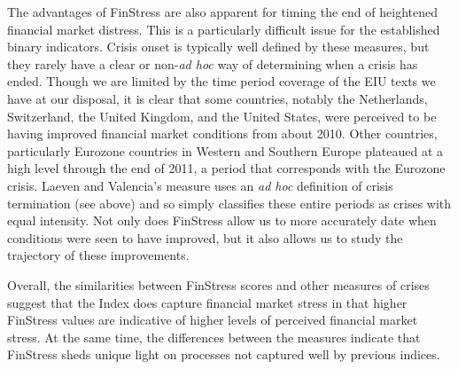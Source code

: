 \documentclass[]{article}
\begin{document}
The advantages of FinStress are also apparent for timing the end of heightened financial market distress. This is a particularly difficult issue for the established binary indicators. Crisis onset is typically well defined by these measures, but they rarely have a clear or non-\emph{ad hoc} way of determining when a crisis has ended. Though we are limited by the time period coverage of the EIU texts we have at our disposal, it is clear that some countries, notably the Netherlands, Switzerland, the United Kingdom, and the United States, were perceived to be having improved financial market conditions from about 2010. Other countries, particularly Eurozone countries in Western and Southern Europe plateaued at a high level through the end of 2011, a period that corresponds with the Eurozone crisis. Laeven and Valencia's measure uses an \emph{ad hoc} definition of crisis termination (see above) and so simply classifies these entire periods as crises with equal intensity. Not only does FinStress allow us to more accurately date when conditions were seen to have improved, but it also allows us to study the trajectory of these improvements.

Overall, the similarities between FinStress scores and other measures of crises suggest that the Index does capture financial market stress in that higher FinStress values are indicative of higher levels of perceived financial market stress. At the same time, the differences between the measures indicate that FinStress sheds unique light on processes not captured well by previous indices.
\end{document}
